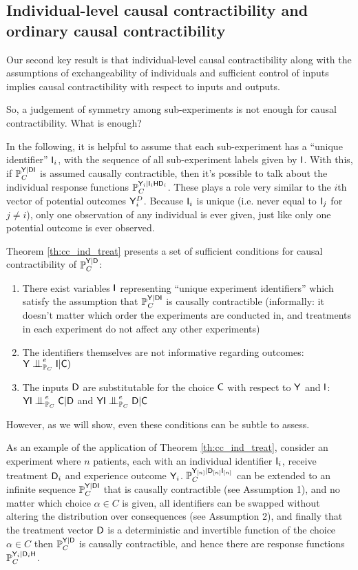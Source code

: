 \subsection{Individual-level causal contractibility and ordinary causal contractibility}

Our second key result is that individual-level causal contractibility along with the assumptions of exchangeability of individuals and sufficient control of inputs implies causal contractibility with respect to inputs and outputs.

So, a judgement of symmetry among sub-experiments is not enough for causal contractibility. What is enough?

In the following, it is helpful to assume that each sub-experiment has a ``unique identifier'' $\mathsf{I}_i$, with the sequence of all sub-experiment labels given by $\mathsf{I}$. With this, if $\mathbb{P}_C^{\mathsf{Y}|\mathsf{DI}}$ is assumed causally contractible, then it's possible to talk about the individual response functions $\mathbb{P}_C^{\mathsf{Y}_i|\mathsf{I}_i\mathsf{H}\mathsf{D}_i}$. These plays a role very similar to the $i$th vector of potential outcomes $\mathsf{Y}^D_i$. Because $\mathsf{I}_i$ is unique (i.e. never equal to $\mathsf{I}_j$ for $j\neq i$), only one observation of any individual is ever given, just like only one potential outcome is ever observed.

Theorem \ref{th:cc_ind_treat} presents a set of sufficient conditions for causal contractibility of $\mathbb{P}_C^{\mathsf{Y}|\mathsf{D}}$:
\begin{enumerate}
    \item There exist variables $\mathsf{I}$ representing ``unique experiment identifiers'' which satisfy the assumption that $\mathbb{P}_C^{\mathsf{Y}|\mathsf{DI}}$ is causally contractible (informally: it doesn't matter which order the experiments are conducted in, and treatments in each experiment do not affect any other experiments)
    \item The identifiers themselves are not informative regarding outcomes: $\RV{Y}\CI_{\prob{P}_C}^e \RV{I}|\RV{C})$
    \item The inputs $\mathsf{D}$ are substitutable for the choice $\mathsf{C}$ with respect to $\mathsf{Y}$ and $\mathsf{I}$: $\RV{YI}\CI^e_{\prob{P}_C} \RV{C}|\RV{D}$ and $\RV{YI}\CI^e_{\prob{P}_C} \RV{D}|\RV{C}$
\end{enumerate}
However, as we will show, even these conditions can be subtle to assess.

As an example of the application of Theorem \ref{th:cc_ind_treat}, consider an experiment where $n$ patients, each with an individual identifier $\mathsf{I}_i$, receive treatment $\mathsf{D}_i$ and experience outcome $\mathsf{Y}_i$. $\mathbb{P}_C^{\mathsf{Y}_{[n]}|\mathsf{D}_{[n]}\mathsf{I}_{[n]}}$ can be extended to an infinite sequence $\mathbb{P}_C^{\mathsf{Y}|\mathsf{DI}}$ that is causally contractible (see Assumption 1), and no matter which choice $\alpha\in C$ is given, all identifiers can be swapped without altering the distribution over consequences (see Assumption 2), and finally that the treatment vector $\mathsf{D}$ is a deterministic and invertible function of the choice $\alpha\in C$ then $\mathbb{P}_C^{\mathsf{Y}|\mathsf{D}}$ is causally contractible, and hence there are response functions $\mathbb{P}_C^{\mathsf{Y}_i|\mathsf{D}_i\mathsf{H}}$.


